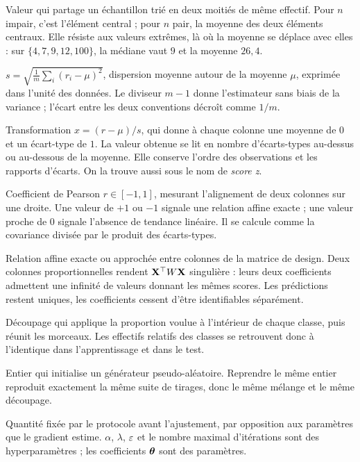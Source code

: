 \begin{description}[style=nextline,leftmargin=0pt]
  \item[\dsym{mediane}{Médiane}]
  Valeur qui partage un échantillon trié en deux moitiés de même effectif. Pour
  $n$ impair, c'est l'élément central ; pour $n$ pair, la moyenne des deux
  éléments centraux. Elle résiste aux valeurs extrêmes, là où la moyenne se
  déplace avec elles : sur $\{4,7,9,12,100\}$, la médiane vaut $9$ et la moyenne
  $26{,}4$.

  \item[\dsym{ecarttype}{Écart-type}]
  $s=\sqrt{\frac1m\sum_i(r_i-\mu)^2}$, dispersion moyenne autour de la moyenne
  $\mu$, exprimée dans l'unité des données. Le diviseur $m-1$ donne l'estimateur
  sans biais de la variance ; l'écart entre les deux conventions décroît comme
  $1/m$.

  \item[\dsym{standardisation}{Standardisation}]
  Transformation $x=(r-\mu)/s$, qui donne à chaque colonne une moyenne de $0$ et
  un écart-type de $1$. La valeur obtenue se lit en nombre d'écarts-types au-dessus
  ou au-dessous de la moyenne. Elle conserve l'ordre des observations et les
  rapports d'écarts. On la trouve aussi sous le nom de \emph{score z}.

  \item[\dsym{correlation}{Corrélation linéaire}]
  Coefficient de Pearson $r\in[-1,1]$, mesurant l'alignement de deux colonnes sur
  une droite. Une valeur de $+1$ ou $-1$ signale une relation affine exacte ; une
  valeur proche de $0$ signale l'absence de tendance linéaire. Il se calcule comme
  la covariance divisée par le produit des écarts-types.

  \item[\dsym{colinearite}{Colinéarité}]
  Relation affine exacte ou approchée entre colonnes de la matrice de design.
  Deux colonnes proportionnelles rendent $\mathbf{X}^\top W\mathbf{X}$ singulière : leurs deux
  coefficients admettent une infinité de valeurs donnant les mêmes scores. Les
  prédictions restent uniques, les coefficients cessent d'être identifiables
  séparément.

  \item[\dsym{stratifie}{Échantillonnage stratifié}]
  Découpage qui applique la proportion voulue à l'intérieur de chaque classe,
  puis réunit les morceaux. Les effectifs relatifs des classes se retrouvent donc
  à l'identique dans l'apprentissage et dans le test.

  \item[\dsym{graine}{Graine}]
  Entier qui initialise un générateur pseudo-aléatoire. Reprendre le même entier
  reproduit exactement la même suite de tirages, donc le même mélange et le même
  découpage.

  \item[\dsym{hyperparam}{Hyperparamètre}]
  Quantité fixée par le protocole avant l'ajustement, par opposition aux
  paramètres que le gradient estime. $\alpha$, $\lambda$, $\varepsilon$ et le nombre
  maximal d'itérations sont des hyperparamètres ; les coefficients $\boldsymbol{\theta}$ sont des
  paramètres.
\end{description}

